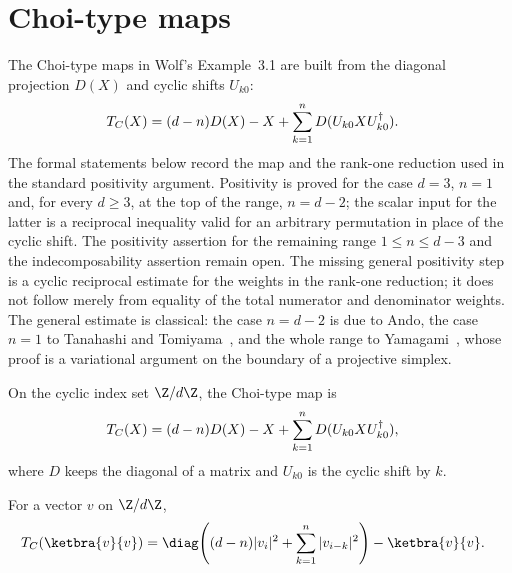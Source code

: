 \section{Choi-type maps}

The Choi-type maps in Wolf's Example~3.1 are built from the diagonal projection
$D(X)$ and cyclic shifts $U_{k0}$:
\begin{align}
    T_C(X)
     & =(d-n)D(X)-X+\sum_{k=1}^nD(U_{k0}XU_{k0}^{\dagger}).
    \notag
\end{align}
The formal statements below record the map and the rank-one reduction used in
the standard positivity argument. Positivity is proved for the case $d=3$,
$n=1$ and, for every $d\ge3$, at the top of the range, $n=d-2$; the scalar
input for the latter is a reciprocal inequality valid for an arbitrary
permutation in place of the cyclic shift. The positivity assertion for the
remaining range $1\le n\le d-3$ and the indecomposability assertion remain
open. The missing general positivity step is a cyclic reciprocal estimate for
the weights in the rank-one reduction; it does not follow merely from equality
of the total numerator and denominator weights. The general estimate is
classical: the case $n=d-2$ is due to Ando, the case $n=1$ to Tanahashi and
Tomiyama~\cite{TanahashiTomiyama1988Indecomposable}, and the whole range to
Yamagami~\cite{Yamagami1993Cyclic}, whose proof is a variational argument on
the boundary of a projective simplex.

\begin{definition}
    \label{def:choi_type_map}
    \leanok
    On the cyclic index set $\Z/d\Z$, the Choi-type map is
    \begin{align}
        T_C(X)
         & =(d-n)D(X)-X+\sum_{k=1}^nD(U_{k0}XU_{k0}^{\dagger}),
        \notag
    \end{align}
    where $D$ keeps the diagonal of a matrix and $U_{k0}$ is the cyclic shift by
    $k$.
\end{definition}

\begin{lemma}
    \label{lem:choi_type_map_rankone}
    \leanok
    For a vector $v$ on $\Z/d\Z$,
    \begin{align}
        T_C(\ketbra{v}{v})
         & =
        \diag\!\left((d-n)|v_i|^2+\sum_{k=1}^n |v_{i-k}|^2\right)
        -\ketbra{v}{v}.
        \notag
    \end{align}
\end{lemma}

